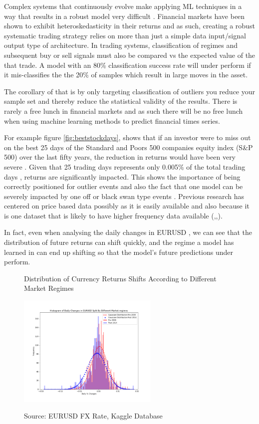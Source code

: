 \documentclass[11pt]{article}
\begin{document}
Complex systems that continuously evolve make applying ML techniques in a way that results in a robust model very difficult \cite{Arnott2018}. Financial markets have been shown to exhibit heteroskedasticity in their returns \cite{Corhay1996} and as such, creating a robust systematic trading strategy relies on more than just a simple data input/signal output type of architecture. In trading systems, classification of regimes and subsequent buy or sell signals must also be compared vs the expected value of the that trade. A model with an 80\% classification success rate will under perform if it mis-classifies the the 20\% of samples which result in large moves in the asset. \par
 The corollary of that is by only targeting classification of outliers you reduce your sample set and thereby reduce the statistical validity of the results. There is rarely a free lunch in financial markets and as such there will be no free lunch when using machine learning methods to predict financial times series. 
\par
For example figure \ref{fig:beststockdays}, shows that if an investor were to miss out on the best 25 days of the Standard and Poors 500 companies equity index (S\&P 500) over the last fifty years, the reduction in returns would have been very severe \cite{bestdays}. Given that 25 trading days represents only 0.005\% of the total trading days , returns are significantly impacted. This shows the importance of being correctly positioned for outlier events and also the fact that one model can be severely impacted by one off or black swan type events \cite{Taleb2007}.
Previous research has centered on price based data possibly as it is easily available and also because it is one dataset that is likely to have higher frequency data available (\cite{Huang2005},\cite{Shen2012},\cite{Wang2014}). 

In fact, even when analysing the daily changes in EURUSD , we can see that the distribution of future returns can shift quickly, and the regime a model has learned in can end up shifting so that the model's future predictions under perform.
\begin{figure}[h]
    \centering
	\caption{Distribution of Currency Returns Shifts According to Different Market Regimes}
     \includegraphics[width=0.6\textwidth]{Regimehist}
    \label{fig:Regimehist}
\caption*{\small Source: EURUSD FX Rate, Kaggle Database}
\end{figure}
 
\end{document}
